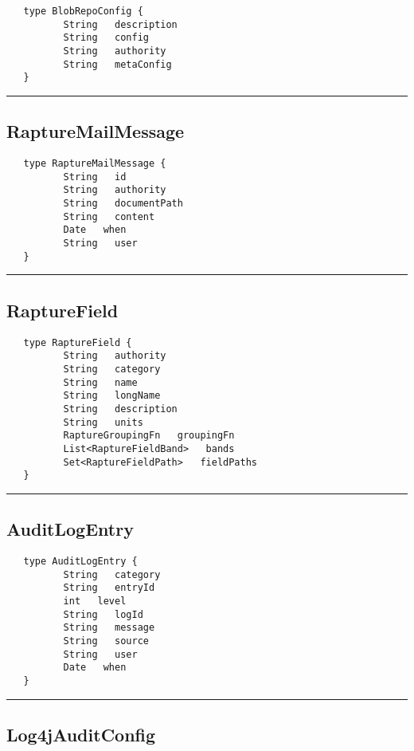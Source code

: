 \begin{verbatim}
   type BlobRepoConfig {
          String   description
          String   config
          String   authority
          String   metaConfig
   }
\end{verbatim}

\rule{15cm}{2pt}
\subsection{RaptureMailMessage}
\label{type:RaptureMailMessage}

\begin{verbatim}
   type RaptureMailMessage {
          String   id
          String   authority
          String   documentPath
          String   content
          Date   when
          String   user
   }
\end{verbatim}

\rule{15cm}{2pt}
\subsection{RaptureField}
\label{type:RaptureField}

\begin{verbatim}
   type RaptureField {
          String   authority
          String   category
          String   name
          String   longName
          String   description
          String   units
          RaptureGroupingFn   groupingFn
          List<RaptureFieldBand>   bands
          Set<RaptureFieldPath>   fieldPaths
   }
\end{verbatim}

\rule{15cm}{2pt}
\subsection{AuditLogEntry}
\label{type:AuditLogEntry}

\begin{verbatim}
   type AuditLogEntry {
          String   category
          String   entryId
          int   level
          String   logId
          String   message
          String   source
          String   user
          Date   when
   }
\end{verbatim}

\rule{15cm}{2pt}
\subsection{Log4jAuditConfig}
\label{type:Log4jAuditConfig}

